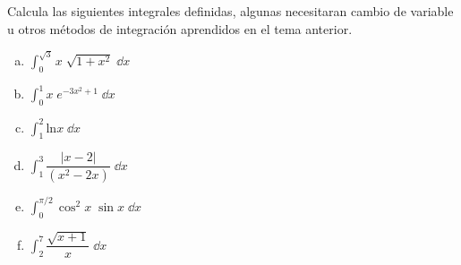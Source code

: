 \begin{ejre}
Calcula las siguientes integrales definidas, algunas necesitaran cambio de variable u otros métodos de integración aprendidos en el tema anterior.
\begin{multicols}{2}
\begin{enumerate}[a) ]
\item   $\displaystyle \int_0^{\sqrt{3}} x\; \sqrt{1+x^2}\; \dd x$
\item  $\displaystyle \int_{0}^{1} x\; e^{-3x^2+1} \; \dd x$
\item  $\displaystyle \int_{1}^{2} \mathrm{ln}x \; \dd x$
\item  $\displaystyle \int_{1}^{3} \dfrac {|x-2|}{(x^2-2x)} \; \dd x$
\item  $\displaystyle \int_{0}^{\pi/2} \cos^2 x \; \sin x \; \dd x$
\item  $\displaystyle \int_{2}^{7} \dfrac {\sqrt{x+1}}{x} \; \dd x$
\end{enumerate}
\end{multicols}
\end{ejre}

